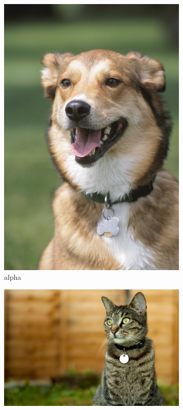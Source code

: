 \begin{figure}
  \begin{subfigure}{0.2\columnwidth}
    \includegraphics[width=\columnwidth]{fig/dog3-collar.jpg}
    \caption{alpha}
  \end{subfigure}
  \hfill
  \begin{subfigure}{0.2\columnwidth}
    \includegraphics[width=\columnwidth]{fig/cat-collar.jpeg}

\end{subfigure}
\end{figure}
